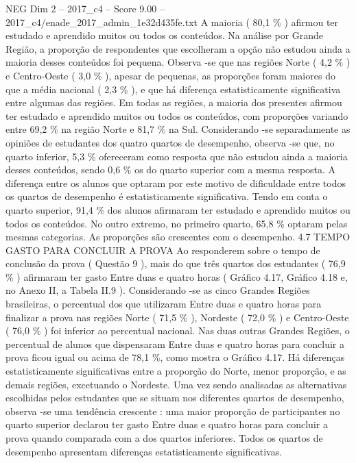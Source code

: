 \begin{textsample}{NEG Dim 2 – 2017\_c4 – Score 9.00 – 2017\_c4/enade\_2017\_admin\_1e32d435fe.txt}
A maioria ( 80,1 \% ) afirmou ter estudado e aprendido muitos ou todos os conteúdos.
Na análise por Grande Região, a proporção de respondentes que escolheram a opção não estudou ainda a maioria desses conteúdos foi pequena.
Observa -se que nas regiões Norte ( 4,2 \% ) e Centro-Oeste ( 3,0 \% ), apesar de pequenas, as proporções foram maiores do que a média nacional ( 2,3 \% ), e que há diferença estatisticamente significativa entre algumas das regiões.
Em todas as regiões, a maioria dos presentes afirmou ter estudado e aprendido muitos ou todos os conteúdos, com proporções variando entre 69,2 \% na região Norte e 81,7 \% na Sul.
Considerando -se separadamente as opiniões de estudantes dos quatro quartos de desempenho, observa -se que, no quarto inferior, 5,3 \% ofereceram como resposta que não estudou ainda a maioria desses conteúdos, sendo 0,6 \% os do quarto superior com a mesma resposta.
A diferença entre os alunos que optaram por este motivo de dificuldade entre todos os quartos de desempenho é estatisticamente significativa.
Tendo em conta o quarto superior, 91,4 \% dos alunos afirmaram ter estudado e aprendido muitos ou todos os conteúdos.
No outro extremo, no primeiro quarto, 65,8 \% optaram pelas mesmas categorias.
As proporções são crescentes com o desempenho. 4.7 TEMPO GASTO PARA CONCLUIR A PROVA Ao responderem sobre o tempo de conclusão da prova ( Questão 9 ), mais do que três quartos dos estudantes ( 76,9 \% ) afirmaram ter gasto Entre duas e quatro horas ( Gráfico 4.17, Gráfico 4.18 e, no Anexo II, a Tabela II.9 ).
Considerando -se as cinco Grandes Regiões brasileiras, o percentual dos que utilizaram Entre duas e quatro horas para finalizar a prova nas regiões Norte ( 71,5 \% ), Nordeste ( 72,0 \% ) e Centro-Oeste ( 76,0 \% ) foi inferior ao percentual nacional.
Nas duas outras Grandes Regiões, o percentual de alunos que dispensaram Entre duas e quatro horas para concluir a prova ficou igual ou acima de 78,1 \%, como mostra o Gráfico 4.17.
Há diferenças estatisticamente significativas entre a proporção do Norte, menor proporção, e as demais regiões, excetuando o Nordeste.
Uma vez sendo analisadas as alternativas escolhidas pelos estudantes que se situam nos diferentes quartos de desempenho, observa -se uma tendência crescente : uma maior proporção de participantes no quarto superior declarou ter gasto Entre duas e quatro horas para concluir a prova quando comparada com a dos quartos inferiores.
Todos os quartos de desempenho apresentam diferenças estatisticamente significativas.

\end{textsample}
